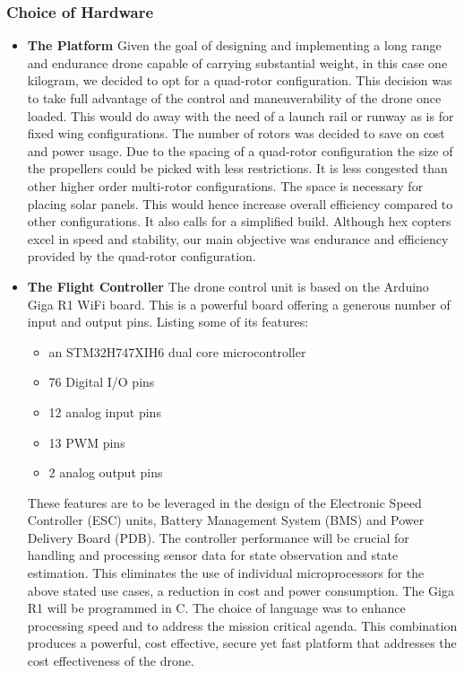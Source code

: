 \subsubsection{Choice of Hardware}
\begin{itemize}
    \item \textbf{The Platform}
    Given the goal of designing and implementing a long range and endurance drone capable of carrying substantial weight, in this case one kilogram, we decided to opt for a quad-rotor configuration. This decision was to take full advantage of the control and maneuverability of the drone once loaded. This would do away with the need of a launch rail or runway as is for fixed wing configurations. The number of rotors was decided to save on cost and power usage. Due to the spacing of a quad-rotor configuration the size of the propellers could be picked with less restrictions. It is less congested than other higher order multi-rotor configurations. The space is necessary for placing solar panels. This would hence increase overall efficiency compared to other configurations. It also calls for a simplified build. Although hex copters excel in speed and stability, our main objective was endurance and efficiency provided by the quad-rotor configuration.\cite{caceres2024developing}

    \item \textbf{The Flight Controller}
    The drone control unit is based on the Arduino Giga R1 WiFi board. This is a powerful board offering a generous number of input and output pins. Listing some of its features:
    \begin{itemize}
        \item an STM32H747XIH6 dual core microcontroller
        \item 76 Digital I/O pins
        \item 12 analog input pins
        \item 13 PWM pins
        \item 2 analog output pins
    \end{itemize}
    These features are to be leveraged in the design of the Electronic Speed Controller (ESC) units, Battery Management System (BMS) and Power Delivery Board (PDB). The controller performance will be crucial for handling and processing sensor data for state observation and state estimation. This eliminates the use of individual microprocessors for the above stated use cases, a reduction in cost and power consumption. The Giga R1 will be programmed in C. The choice of language was to enhance processing speed and to address the mission critical agenda. This combination produces a powerful, cost effective, secure yet fast platform that addresses the cost effectiveness of the drone.


\end{itemize}
